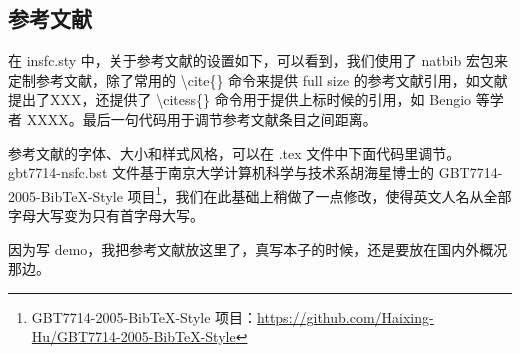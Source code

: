 




\subsection{参考文献}
在 insfc.sty 中，关于参考文献的设置如下，可以看到，我们使用了 natbib 宏包来定制参考文献，除了常用的 \textbackslash cite\{\} 命令来提供 full size 的参考文献引用，如文献\cite{li2014object}提出了XXX，还提供了 \textbackslash citess\{\} 命令用于提供上标时候的引用，如 Bengio 等学者 XXXX。最后一句代码用于调节参考文献条目之间距离。


参考文献的字体、大小和样式风格，可以在 .tex 文件中下面代码里调节。gbt7714-nsfc.bst 文件基于南京大学计算机科学与技术系胡海星博士的 GBT7714-2005-BibTeX-Style 项目\footnote{GBT7714-2005-BibTeX-Style 项目：\href{https://github.com/Haixing-Hu/GBT7714-2005-BibTeX-Style}{https://github.com/Haixing-Hu/GBT7714-2005-BibTeX-Style}}，我们在此基础上稍做了一点修改，使得英文人名从全部字母大写变为只有首字母大写。

% 		
% 		

因为写 demo，我把参考文献放这里了，真写本子的时候，还是要放在国内外概况那边。

\begin{bibenv}
	
	 
\end{bibenv}


